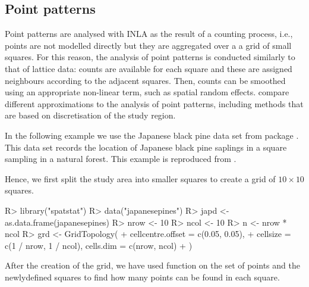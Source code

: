 \documentclass[article]{jss}
\begin{document}
\subsection{Point patterns}

Point patterns are analysed with INLA as the result of a counting process,
i.e., points are not modelled directly but they are aggregated over a a grid
of small squares. For this reason, the analysis of point patterns is conducted
similarly to that of lattice data: counts are available for each square and 
these are assigned neighbours according to the adjacent squares. Then, counts
can be smoothed using an appropriate non-linear term, such as spatial
random effects. \citet{HossainLawson:2009} compare different approximations
to the analysis of point patterns, including methods that are based on discretisation of the study region.

In the following example we use the Japanese black pine data set from
 package  \citep{spatstat:2005}. This data set records the location of
Japanese black pine saplings in a square sampling in a natural forest.  This
example is reproduced from \citet{GomezRubioetal:2013}.

Hence, we first split the study area into smaller squares to create a
grid of $10\times 10$ squares.

\begin{Schunk}
\begin{Sinput}
R> library("spatstat")
R> data("japanesepines")
R> japd <- as.data.frame(japanesepines)
R> nrow <- 10
R> ncol <- 10
R> n <- nrow * ncol
R> grd <- GridTopology(
+     cellcentre.offset = c(0.05, 0.05),
+     cellsize = c(1 / nrow, 1 / ncol), cells.dim = c(nrow, ncol)
+  )
\end{Sinput}
\end{Schunk}


After the creation of the grid, we have used function  on
the set of points and the newlydefined squares to find how many points can be
found in each square.

\begin{Schunk}
\end{Schunk}
\end{document}
